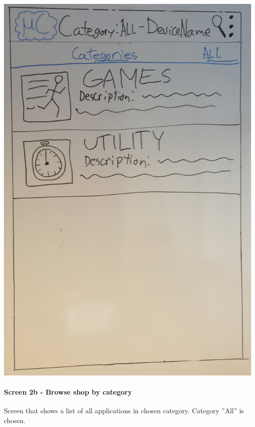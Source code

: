 \begin{image}[H]
\includegraphics[scale=0.2]{images/Design_guide/Screen2a.png}
\end{image}


\paragraph{Screen 2b - Browse shop by category}
Screen that shows a list of all applications in chosen category. Category ''All'' is chosen.

